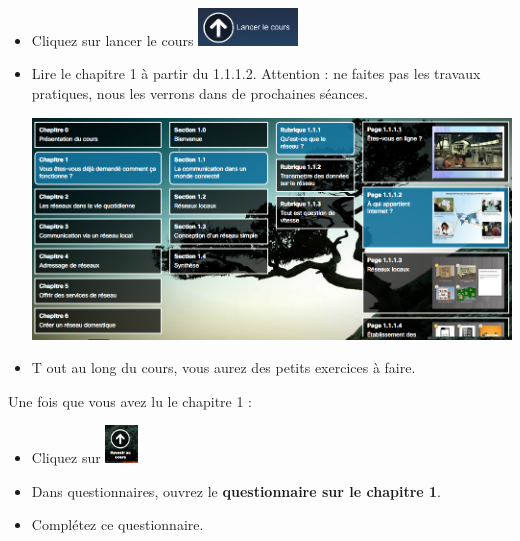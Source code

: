 \documentclass[11pt]{article}
\begin{document}
	\begin{UPSTIactivite}
		\begin{itemize}
			\item Cliquez sur lancer le cours \includegraphics[height=1cm]{Src/Images/lancer_cours}
			\item Lire le chapitre 1 à partir du 1.1.1.2. Attention : ne faites pas les travaux pratiques, nous les verrons dans de prochaines séances.
			\begin{center}
				\includegraphics[width=.5\textwidth]{Src/Images/chapitre_1}
			\end{center}
			\item T out au long du cours, vous aurez des petits exercices à faire.
		\end{itemize}
	\end{UPSTIactivite}

\begin{UPSTIactivite}[][Questionnaire]
	Une fois que vous avez lu le chapitre 1 :
	\begin{itemize}
		\item Cliquez sur \includegraphics[height=1cm]{Src/Images/revenir}
		\item Dans questionnaires, ouvrez le \textbf{questionnaire sur le chapitre 1}.
		\item Complétez ce questionnaire.
	\end{itemize}
\end{UPSTIactivite}
\end{document}
